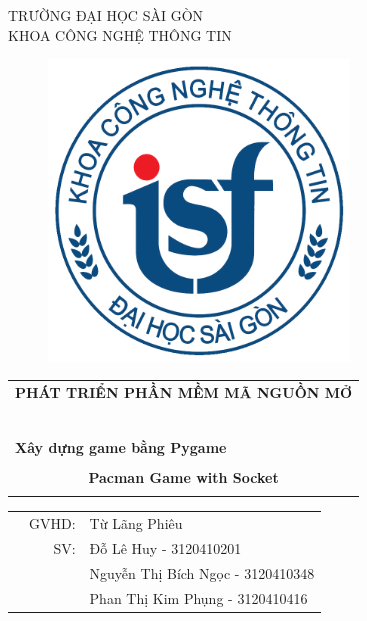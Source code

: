 \documentclass[a4paper]{article}
\begin{document}
\begin{titlepage}
\begin{center}
TRƯỜNG ĐẠI HỌC SÀI GÒN \\
KHOA CÔNG NGHỆ THÔNG TIN
\end{center}
\vspace{1cm}

\begin{figure}[h!]
\begin{center}
\includegraphics[width=8cm]{logoITSGU.png}
\end{center}
\end{figure}

\vspace{0.5cm}


\begin{center}
\begin{tabular}{c}
	\multicolumn{1}{l}{\textbf{{\Large PHÁT TRIỂN PHẦN MỀM MÃ NGUỒN MỞ}}}\\
	~~\\
	\hline
	\\
	\multicolumn{1}{l}{\textbf{{\Large Xây dựng game bằng Pygame}}}\\
	\\
	
	\textbf{{\Huge Pacman Game with Socket}}\\
	\\
	\hline
\end{tabular}
\end{center}


\begin{table}[h]
\begin{tabular}{rrl}
\hspace{8 cm} & GVHD: &Từ Lãng Phiêu\\
& SV: & Đỗ Lê Huy - 3120410201\\
& & Nguyễn Thị Bích Ngọc - 3120410348 \\
& & Phan Thị Kim Phụng - 3120410416 \\
\end{tabular}
\vspace{1.2 cm}
\end{table}


\end{titlepage}
\end{document}

